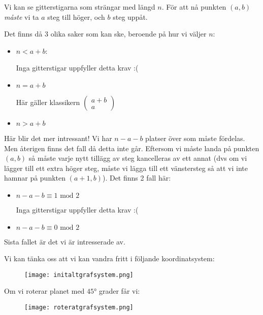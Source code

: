\documentclass{tufte-handout}
\begin{document}
\begin{ans}
  \noindent Vi kan se gitterstigarna som strängar med längd $n$. För att nå punkten $(a,b)$ \textit{måste} vi ta $a$ steg till höger, och $b$ steg uppåt.
  \par\bigskip
  \noindent Det finns då 3 olika saker som kan ske, beroende på hur vi väljer $n$:\par
  \begin{itemize}
    \item $n < a+ b$:\par
      Inga gitterstigar uppfyller detta krav :(
    \item $n = a+b$\par
      Här gäller klassikern $\begin{pmatrix}a+b\\a\end{pmatrix}$
    \item $n>a+b$\par
  \end{itemize}
  \noindent Här blir det mer intressant! Vi har $n-a-b$ platser över som måste fördelas. Men återigen finns det fall då detta inte går. Eftersom vi måste landa på punkten $(a,b)$ så måste varje nytt tillägg av steg kancelleras av ett annat (dvs om vi lägger till ett extra höger steg, måste vi lägga till ett vänstersteg så att vi inte hamnar på punkten $(a+1,b)$). Det finns 2 fall här:\par
  \begin{itemize}
    \item $n-a-b\equiv1\text{ mod } 2$\par
      Inga gitterstigar uppfyller detta krav :( 
    \item $n-a-b\equiv0\text{ mod } 2$\par\par
  \end{itemize}\par
  \noindent Sista fallet är det vi är intresserade av.
  \par\bigskip
  \noindent Vi kan tänka oss att vi kan vandra fritt i följande koordinatsystem:
  \begin{figure}[h]
        \centering
        \texttt{[image: initaltgrafsystem.png]}
  \end{figure}
  \par\bigskip
  \noindent Om vi roterar planet med $45°$ grader får vi:
  \begin{figure}[h]
        \centering
        \texttt{[image: roteratgrafsystem.png]}
  \end{figure}

\end{ans}
\end{document}
